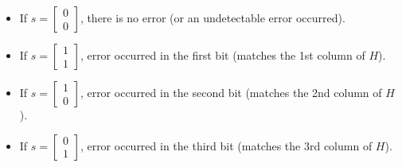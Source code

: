 \begin{example}
\begin{itemize}
\item If $s = \begin{bmatrix} 0 \\ 0 \end{bmatrix}$, there is no error (or an undetectable error occurred).
\item If $s = \begin{bmatrix} 1 \\ 1 \end{bmatrix}$, error occurred in the first bit (matches the 1st column of $H$).
\item If $s = \begin{bmatrix} 1 \\ 0 \end{bmatrix}$, error occurred in the second bit (matches the 2nd column of $H$).
\item If $s = \begin{bmatrix} 0 \\ 1 \end{bmatrix}$, error occurred in the third bit (matches the 3rd column of $H$).
\end{itemize}
\end{example}
